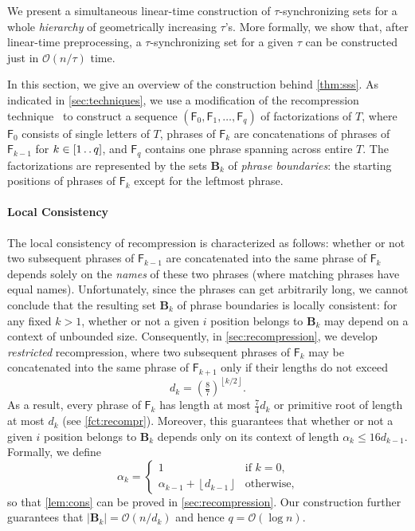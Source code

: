 \documentclass[a4paper]{article}
\theoremstyle{definition}
\theoremstyle{remark}
\newcommand{\B}{\mathbf{B}}
\newcommand{\floor}[1]{\left\lfloor #1 \right\rfloor}
\newcommand{\dd}{\mathinner{\ldotp\ldotp}}
\newcommand{\osiemsiedem}{\left(\tfrac{8}{7}\right)}
\newcommand{\Oh}{\mathcal{O}}
\newcommand{\F}{\mathsf{F}}
\begin{document}
\prpsynch*

We present a simultaneous linear-time construction of $\tau$-synchronizing sets for
a whole \emph{hierarchy} of geometrically increasing $\tau$'s.
More formally, we show that, after linear-time preprocessing, a 
$\tau$-synchronizing set for a given $\tau$ can be constructed just in $\Oh(n/\tau)$ time.

\thmsss*

In this section, we give an overview of the construction behind \cref{thm:sss}.
As indicated in \cref{sec:techniques}, we use a modification of the recompression technique~\cite{DBLP:journals/jacm/Jez16} to construct a sequence $(\F_0,\F_1,\dots,\F_q)$ of factorizations of $T$, where
$\F_0$ consists of single letters of $T$, phrases of $\F_k$ are concatenations of phrases of $\F_{k-1}$ for $k \in [1\dd q]$,
and $\F_q$ contains one phrase spanning across entire $T$.
The factorizations are represented by the sets $\B_k$ of \emph{phrase boundaries}: the starting positions of phrases of $\F_k$ except for the leftmost phrase.

\paragraph*{\bf Local Consistency}
The local consistency of recompression is characterized as follows: whether or not two subsequent phrases of $\F_{k-1}$ are concatenated into the same phrase of $\F_k$ depends solely on the \emph{names} of these two phrases (where matching phrases have equal names). 
Unfortunately, since the phrases can get arbitrarily long, we cannot conclude that the resulting set $\B_k$ of phrase boundaries is locally consistent:
for any fixed $k>1$, whether or not a given $i$ position belongs to $\B_k$ may depend on a context of unbounded size.
Consequently, in \cref{sec:recompression}, we develop \emph{restricted} recompression, where two subsequent phrases of $\F_{k}$ may be concatenated into the same phrase of $\F_{k+1}$ only if their lengths do not exceed
\[d_k = \osiemsiedem^{\floor{k/2}}.\]
As a result, every phrase of $\F_k$ has length at most $\frac74 d_k$ or primitive root of length at most $d_k$ (see \cref{fct:recompr}).
Moreover, this guarantees that whether or not a given $i$ position belongs to $\B_k$ depends only on its context of length $\alpha_k \le 16d_{k-1}$.
Formally, we define
\[\alpha_k = \begin{cases} 1 & \text{if }k=0,\\
   \alpha_{k-1}+\floor{d_{k-1}} & \text{otherwise},\end{cases}\]
so that \cref{lem:cons} can be proved in \cref{sec:recompression}.
Our construction further guarantees that $|\B_k| = \Oh(n/d_k)$ and hence $q=\Oh(\log n)$.
\end{document}
